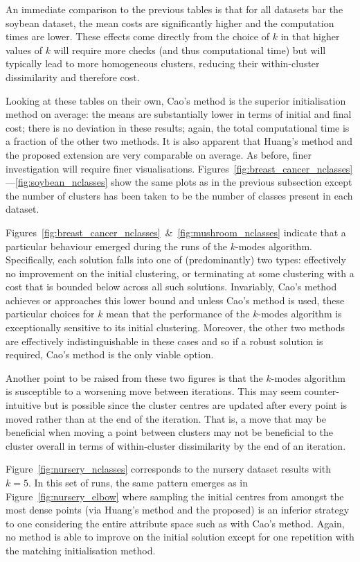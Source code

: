 An immediate comparison to the previous tables is that for all datasets bar the
soybean dataset, the mean costs are significantly higher and the computation
times are lower. These effects come directly from the choice of \(k\) in that
higher values of \(k\) will require more checks (and thus computational time)
but will typically lead to more homogeneous clusters, reducing their
within-cluster dissimilarity and therefore cost.

Looking at these tables on their own, Cao's method is the superior
initialisation method on average: the means are substantially lower in terms of
initial and final cost; there is no deviation in these results; again, the total
computational time is a fraction of the other two methods. It is also apparent
that Huang's method and the proposed extension are very comparable on average.
As before, finer investigation will require finer visualisations.
Figures~\ref{fig:breast_cancer_nclasses}---\ref{fig:soybean_nclasses} show the
same plots as in the previous subsection except the number of clusters has been
taken to be the number of classes present in each dataset.

Figures~\ref{fig:breast_cancer_nclasses}~\&~\ref{fig:mushroom_nclasses} indicate
that a particular behaviour emerged during the runs of the \(k\)-modes
algorithm. Specifically, each solution falls into one of (predominantly) two
types: effectively no improvement on the initial clustering, or terminating at
some clustering with a cost that is bounded below across all such solutions.
Invariably, Cao's method achieves or approaches this lower bound and unless
Cao's method is used, these particular choices for \(k\) mean that the
performance of the \(k\)-modes algorithm is exceptionally sensitive to its
initial clustering. Moreover, the other two methods are effectively
indistinguishable in these cases and so if a robust solution is required, Cao's
method is the only viable option.

Another point to be raised from these two figures is that the \(k\)-modes
algorithm is susceptible to a worsening move between iterations. This may seem
counter-intuitive but is possible since the cluster centres are updated after
every point is moved rather than at the end of the iteration. That is, a move
that may be beneficial when moving a point between clusters may not be
beneficial to the cluster overall in terms of within-cluster dissimilarity by
the end of an iteration.

Figure~\ref{fig:nursery_nclasses} corresponds to the nursery dataset results
with \(k=5\). In this set of runs, the same pattern emerges as in
Figure~\ref{fig:nursery_elbow} where sampling the initial centres from amongst
the most dense points (via Huang's method and the proposed) is an inferior
strategy to one considering the entire attribute space such as with Cao's
method. Again, no method is able to improve on the initial solution except for
one repetition with the matching initialisation method.

